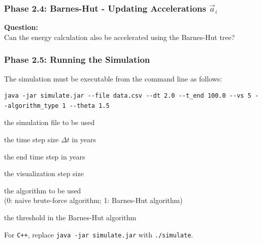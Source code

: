 \begin{frame}[fragile]
  \frametitle{Phase 2.4: Barnes-Hut - Updating Accelerations $\vec{a}_i$}
  \begin{algorithmcl}
    \begin{algorithmic}[1]
                \Else
                    \EndFor
                \EndIf
                \EndProcedure
    \end{algorithmic}
    \end{algorithmcl}
    \vfill
    \textbf{Question:} \\
    Can the energy calculation also be accelerated using the Barnes-Hut tree?
\end{frame}

\begin{frame}[fragile]
    \frametitle{Phase 2.5: Running the Simulation}

    The simulation must be executable from the command line as follows:
    \begin{verbatim}
java -jar simulate.jar --file data.csv --dt 2.0 --t_end 100.0 --vs 5 --algorithm_type 1 --theta 1.5
    \end{verbatim}

    \begin{description}[labelwidth=\widthof{\bfseries \texttt{--theta}}]
        \item[\texttt{--file}] the simulation file to be used
        \item[\texttt{--dt}] the time step size $\Delta t$ in years
        \item[\texttt{--t\_end}] the end time step in years
        \item[\texttt{--vs}] the visualization step size
        \item[\texttt{--algorithm\_type}] the algorithm to be used \\
        (0: naive brute-force algorithm; 1: Barnes-Hut algorithm)
        \item[\texttt{--theta}] the threshold in the Barnes-Hut algorithm
    \end{description}
    \vfill
    For \texttt{C++}, replace \texttt{java -jar simulate.jar} with \texttt{./simulate}.
\end{frame}

